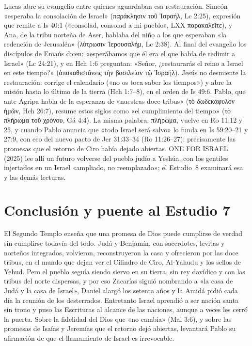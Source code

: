 \documentclass[11pt,letterpaper]{article}
\newcommand{\grc}[1]{\foreignlanguage{ancientgreek}{#1}}
\begin{document}
Lucas abre su evangelio entre quienes aguardaban esa restauración. Simeón «esperaba la consolación de Israel» (\grc{παράκλησιν τοῦ Ἰσραήλ}, Lc 2:25), expresión que remite a Is 40:1 («consolad, consolad a mi pueblo», LXX \grc{παρακαλεῖτε}), y Ana, de la tribu norteña de Aser, hablaba del niño a los que esperaban «la redención de Jerusalén» (\grc{λύτρωσιν Ἰερουσαλήμ}, Lc 2:38). Al final del evangelio los discípulos de Emaús dicen: «esperábamos que él era el que había de redimir a Israel» (Lc 24:21), y en Hch 1:6 preguntan: «Señor, ¿restaurarás el reino a Israel en este tiempo?» (\grc{ἀποκαθιστάνεις τὴν βασιλείαν τῷ Ἰσραήλ}). Jesús no desmiente la restauración: corrige el calendario («no os toca saber los tiempos») y abre la misión hasta lo último de la tierra (Hch 1:7--8), en el orden de Is 49:6. Pablo, que ante Agripa habla de la esperanza de «nuestras doce tribus» (\grc{τὸ δωδεκάφυλον ἡμῶν}, Hch 26:7), resume estos siglos como «el cumplimiento del tiempo» (\grc{τὸ πλήρωμα τοῦ χρόνου}, Gá 4:4). La misma palabra, \grc{πλήρωμα}, vuelve en Ro 11:12 y 25, y cuando Pablo anuncia que «todo Israel será salvo» lo funda en Is 59:20--21 y 27:9, con eco del nuevo pacto de Jer 31:33--34 (Ro 11:26--27): precisamente las promesas que el retorno de Ciro había dejado abiertas. ONE FOR ISRAEL (2025) lee allí un futuro volverse del pueblo judío a Yeshúa, con los gentiles injertados en un Israel «ampliado, no reemplazado»; el Estudio~8 examinará esa y las demás lecturas.

\section{Conclusión y puente al Estudio 7}

El Segundo Templo enseña que una promesa de Dios puede cumplirse de verdad sin cumplirse todavía del todo. Judá y Benjamín, con sacerdotes, levitas y norteños integrados, volvieron, reconstruyeron la casa y ofrecieron por las doce tribus, en el mundo que dejan ver el Cilindro de Ciro, Al-Yahudu y los sellos de Yehud. Pero el pueblo seguía siendo siervo en su tierra, sin rey davídico y con las tribus del norte dispersas, y por eso Zacarías siguió nombrando a «la casa de Judá y la casa de Israel», Daniel alargó los setenta años y la Amidá pidió cada día la reunión de los desterrados. Entretanto Israel aprendió a ser nación santa sin trono y puso las Escrituras al alcance de las naciones, aunque a veces les cerró la puerta. Sobre la fidelidad del Dios que «no cambia» (Mal 3:6), y sobre las promesas de Isaías y Jeremías que el retorno dejó abiertas, levantará Pablo su afirmación de que el llamamiento de Israel es irrevocable.
\end{document}

